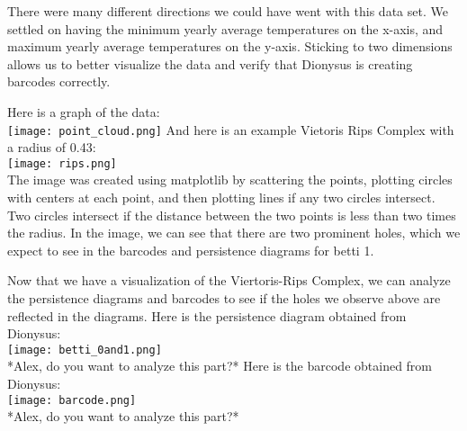 \documentclass[12pt]{report}
\begin{document}
There were many different directions we could have went with this data set. We settled on having the minimum yearly average temperatures on the x-axis, and maximum yearly average temperatures on the y-axis. Sticking to two dimensions allows us to better visualize the data and verify that Dionysus is creating barcodes correctly. \par
Here is a graph of the data:\\
\texttt{[image: point\_cloud.png]}
\clearpage
And here is an example Vietoris Rips Complex with a radius of 0.43:\\
\texttt{[image: rips.png]}\\
The image was created using matplotlib by scattering the points, plotting circles with centers at each point, and then plotting lines if any two circles intersect. Two circles intersect if the distance between the two points is less than two times the radius. In the image, we can see that there are two prominent holes, which we expect to see in the barcodes and persistence diagrams for betti 1.\par
Now that we have a visualization of the Viertoris-Rips Complex, we can analyze the persistence diagrams and barcodes to see if the holes we observe above are reflected in the diagrams.
\clearpage
Here is the persistence diagram obtained from Dionysus:\\
\texttt{[image: betti\_0and1.png]}\\
*Alex, do you want to analyze this part?*
\clearpage
Here is the barcode obtained from Dionysus:\\
\texttt{[image: barcode.png]}\\
*Alex, do you want to analyze this part?*



\clearpage
\end{document}
